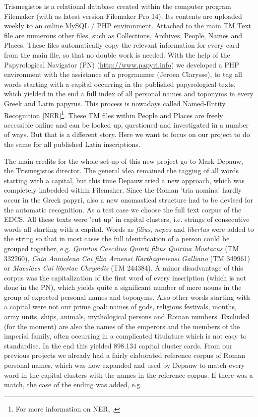 \documentclass[amsthm,ebook]{saparticle}
\begin{document}
 Trismegistos is a relational database created within the computer program Filemaker (with as latest version
Filemaker Pro 14). Its contents are uploaded weekly to an online MySQL / PHP environment. Attached to the main TM Text
file are numerous other files, such as Collections, Archives, People, Names and Places. These files automatically copy
the relevant information for every card from the main file, so that no double work is needed. With the help of the
Papyrological Navigator (PN) (\url{http://www.papyri.info}) we developed a PHP environment with the assistance of a
programmer (Jeroen Clarysse), to tag all words starting with a capital occurring in the published papyrological texts,
which yielded in the end a full index of all personal names and toponyms in every Greek and Latin papyrus. This process
is nowadays called Named-Entity Recognition [NER]\footnote{ For more information on NER, \citet[304-313]{BrouxDepauw}.}. These
TM files within People and Places are freely accessible online and can be looked up, questioned and investigated in a
number of ways. But that is a different story. Here we want to focus on our project to do the same for all published
Latin inscriptions.


 The main credits for the whole set-up of this new project go to Mark Depauw, the Trismegistos director. The general
idea remained the tagging of all words starting with a capital, but this time Depauw tried a new approach, which was
completely imbedded within Filemaker. Since the Roman 'tria nomina' hardly occur in the Greek papyri, also a new
onomastical structure had to be devised for the automatic recognition. As a test case we choose the full text corpus of
the EDCS. All these texts were 'cut up' in capital clusters, i.e. strings of consecutive words all starting with a
capital. Words as \emph{filius}, \emph{nepos} and \emph{libertus} were added to the string so that in most cases the full identification of
a person could be grouped together, e.g. \emph{Quintus Caecilius Quinti filius Quirina Mustacus} (TM 332260), \emph{Caio Annioleno
Cai filio Arnensi Karthaginiensi Galliano} (TM 349961) or \emph{Maesiaes Cai libertae Chrysidis} (TM 244384). A minor
disadvantage of this corpus was the capitalization of the first word of every inscription (which is not done in the
PN), which yields quite a significant number of mere nouns in the group of expected personal names and toponyms. Also
other words starting with a capital were not our prime goal: names of gods, religious festivals, months, army units,
ships, animals, mythological persons and Roman numbers. Excluded (for the moment) are also the names of the emperors
and the members of the imperial family, often occurring in a complicated titulature which is not easy to standardise.
In the end this yielded 898.134 capital cluster cards. From our previous projects we already had a fairly elaborated
reference corpus of Roman personal names, which was now expanded and used by Depauw to match every word in the capital
clusters with the names in the reference corpus. If there was a match, the case of the ending was added, e.g.
\end{document}
